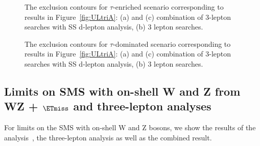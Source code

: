 \begin{figure}[!p]
\begin{center}
\caption{The exclusion contours for $\tau$-enriched scenario corresponding to results in Figure~\ref{fig:ULtriA}: 
(a) and (c) combination of 3-lepton searches with SS d-lepton analysis, 
(b) 3 lepton searches.}
\label{fig:ULtriB}
\end{center}
\end{figure}
\begin{figure}[!p]
\begin{center}
\caption{The exclusion contours for $\tau$-dominated scenario corresponding to results in Figure~\ref{fig:ULtriA}: 
(a) and (c) combination of 3-lepton searches with SS d-lepton analysis, 
(b) 3 lepton searches.}
\label{fig:ULtriC}
\end{center}
\end{figure}


\subsection{Limits on SMS with on-shell W and Z from WZ + $\ETmiss$ and three-lepton analyses}
For limits on the SMS with on-shell W and Z bosons, we 
show the results of the \wzmet analysis~\cite{AN-2012:254}, the three-lepton analysis as well as the combined result.

